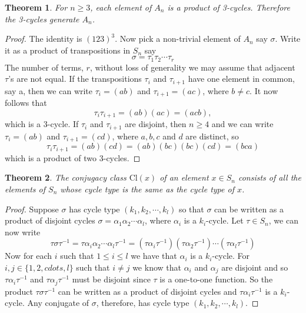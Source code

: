 \documentclass[a4paper,10pt]{article}
\newtheorem{theorem}{Theorem}[section]
\theoremstyle{definition}
\begin{document}
\begin{theorem}
For $n\geq 3$, each element of $A_n$ is a product of 3-cycles. Therefore the 3-cycles generate $A_n$.
\end{theorem}
\begin{proof}
The identity is $(123)^3$. Now pick a non-trivial element of $A_n$ say $\sigma$. Write it as a product of transpositions in $S_n$ say
\begin{equation}
\sigma = \tau_1\tau_2 \cdots \tau_r 
\end{equation}
The number of terms, $r$, without loss of generality we may assume that adjacent $\tau$'s are not equal. If the transpositions $\tau_i$ and $\tau_{i+1}$ have one element in common, say a, then we can write $\tau_i = (ab)$ and $\tau_{i+1}=(ac)$, where $b\neq c$. It now follows that
\begin{equation}
\tau_i\tau_{i+1} = (ab)(ac) = (acb), 
\end{equation}
which is a 3-cycle. If $\tau_i$ and $\tau_{i+1}$ are disjoint, then $n\geq 4$ and we can write $\tau_i = (ab)$ and $\tau_{i+1} = (cd)$, where $a,b,c$ and $d$ are distinct, so 
\begin{equation}
\tau_i\tau_{i+1}=(ab)(cd)=(ab)(bc)(bc)(cd)=(bca)%
\end{equation}
which is a product of two 3-cycles.



\end{proof}

\begin{theorem}
The conjugacy class $\textrm{Cl}(x)$ of an element $x \in S_n$ consists of all the elements of $S_n$ whose cycle type is the same as the cycle type of $x$.  
\end{theorem}

\begin{proof}
Suppose $\sigma$ has cycle type $(k_1,k_2,\cdots,k_l)$ so that $\sigma$ can be written as a product of disjoint cycles $\sigma = \alpha_1\alpha_2\cdots \alpha_l$, where $\alpha_i$ is a $k_i$-cycle. Let $\tau\in S_n$, we can now write
\begin{equation}
\tau \sigma \tau^{-1} = \tau \alpha_i\alpha_2\cdots\alpha_l\tau^{-1}=(\tau \alpha_i\tau^{-1})(\tau\alpha_2\tau^{-1})\cdots(\tau\alpha_l\tau^{-1}) 
\end{equation}
Now for each $i$ such that $1\leq i\leq l$ we have that $\alpha_i$ is a $k_i$-cycle. For $i,j\in\{1,2,cdots,l\}$
such that $i\neq j$ we know that $\alpha_i$ and $\alpha_j$ are disjoint and so $\tau\alpha_i\tau^{-1}$ and $\tau\alpha_j\tau^{-1}$ must be disjoint since $\tau$ is a one-to-one function. So the product $\tau\sigma\tau^{-1}$ can be written as a product of disjoint cycles and $\tau\alpha_i\tau^{-1}$ is a $k_i$-cycle. Any conjugate of $\sigma$, therefore, has cycle type $(k_1,k_2,\cdots,k_l)$.  
\end{proof}
\end{document}
